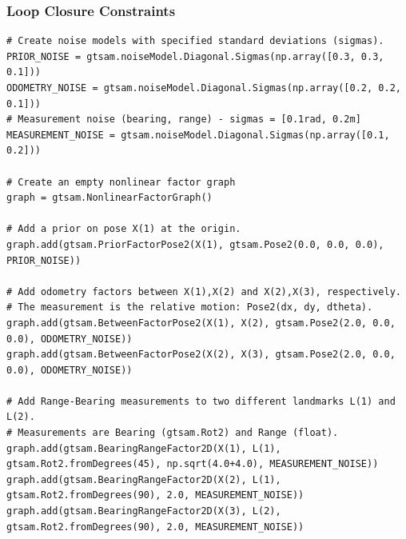 \begin{frame}[fragile]
    \frametitle{Loop Closure Constraints}


    \scriptsize

\begin{lstlisting}[style=python]
# Create noise models with specified standard deviations (sigmas).
PRIOR_NOISE = gtsam.noiseModel.Diagonal.Sigmas(np.array([0.3, 0.3, 0.1]))
ODOMETRY_NOISE = gtsam.noiseModel.Diagonal.Sigmas(np.array([0.2, 0.2, 0.1]))
# Measurement noise (bearing, range) - sigmas = [0.1rad, 0.2m]
MEASUREMENT_NOISE = gtsam.noiseModel.Diagonal.Sigmas(np.array([0.1, 0.2]))

# Create an empty nonlinear factor graph
graph = gtsam.NonlinearFactorGraph()

# Add a prior on pose X(1) at the origin.
graph.add(gtsam.PriorFactorPose2(X(1), gtsam.Pose2(0.0, 0.0, 0.0), PRIOR_NOISE))

# Add odometry factors between X(1),X(2) and X(2),X(3), respectively.
# The measurement is the relative motion: Pose2(dx, dy, dtheta).
graph.add(gtsam.BetweenFactorPose2(X(1), X(2), gtsam.Pose2(2.0, 0.0, 0.0), ODOMETRY_NOISE))
graph.add(gtsam.BetweenFactorPose2(X(2), X(3), gtsam.Pose2(2.0, 0.0, 0.0), ODOMETRY_NOISE))

# Add Range-Bearing measurements to two different landmarks L(1) and L(2).
# Measurements are Bearing (gtsam.Rot2) and Range (float).
graph.add(gtsam.BearingRangeFactor2D(X(1), L(1), gtsam.Rot2.fromDegrees(45), np.sqrt(4.0+4.0), MEASUREMENT_NOISE))
graph.add(gtsam.BearingRangeFactor2D(X(2), L(1), gtsam.Rot2.fromDegrees(90), 2.0, MEASUREMENT_NOISE))
graph.add(gtsam.BearingRangeFactor2D(X(3), L(2), gtsam.Rot2.fromDegrees(90), 2.0, MEASUREMENT_NOISE))
\end{lstlisting}

\end{frame}

